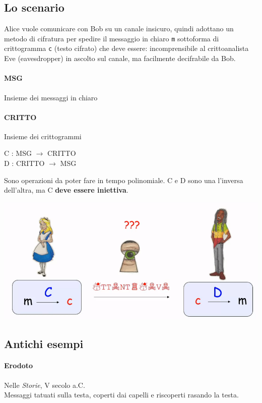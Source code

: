 \documentclass[10pt]{book}
\begin{document}
\subsection{Lo scenario}
Alice vuole comunicare con Bob su un canale insicuro, quindi adottano un metodo di cifratura per spedire il messaggio in chiaro \texttt{m} sottoforma di crittogramma \texttt{c} (testo cifrato) che deve essere: incomprensibile al crittoanalista Eve (eavesdropper) in ascolto sul canale, ma facilmente decifrabile da Bob.
\paragraph{MSG} Insieme dei messaggi in chiaro
\paragraph{CRITTO} Insieme dei crittogrammi
\begin{center}
C : MSG $\rightarrow$ CRITTO\\
D : CRITTO $\rightarrow$ MSG
\end{center}
Sono operazioni da poter fare in tempo polinomiale. 
C e D sono una l'inversa dell'altra, ma C \textbf{deve essere iniettiva}.
\begin{center}
\includegraphics[scale=0.55]{1.png}
\end{center}
\subsection{Antichi esempi}
\paragraph{Erodoto} Nelle \textit{Storie}, V secolo a.C.\\
Messaggi tatuati sulla testa, coperti dai capelli e riscoperti rasando la testa.
\end{document}
